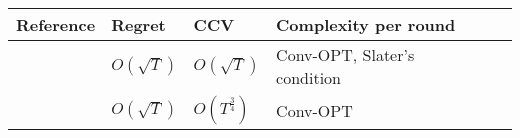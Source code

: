  \begin{table*}[t]
  \begin{tabular}{llllll}
    \toprule
   \small { Reference}  & \small {Regret} & \small {CCV} & \small {Complexity per round}\\
    \midrule
    \small {\citet{neely2017online}}  & \small {$O(\sqrt{T})$} & \small {$O(\sqrt{T})$} & \small {Conv-OPT, \small {Slater's condition}} \\
    \small {\citet{guo2022online}}  & \small {$O(\sqrt{T})$} & \small {$O(T^{\frac{3}{4}})$} & \small {Conv-OPT} \\

\end{tabular}
\end{table*}
